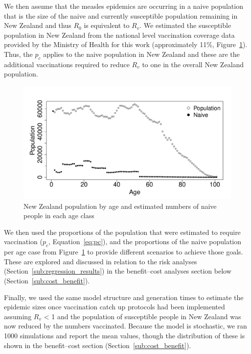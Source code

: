\documentclass{article}
\begin{document}
We then assume that the measles epidemics are occurring in a naive population that is the size of the naive and currently susceptible population remaining in New Zealand and thus $R_0$ is equivalent to $R_v$. We estimated the susceptible population in New Zealand from the national level vaccination coverage data provided by the Ministry of Health for this work (approximately 11\%, Figure~\ref{fig:naive}). Thus, the $p_c$ applies to the naive population in New Zealand and these are the additional vaccinations required to reduce $R_v$ to one in the overall New Zealand population.


\begin{figure}[ht!]
\begin{center}
\includegraphics{interimreport2-021}
\end{center}
\caption{New Zealand population by age and estimated numbers of naive people in each age class}
\label{fig:naive}
\end{figure}

We then used the proportions of the population that were estimated to require vaccination ($p_c$, Equation~\ref{eq:pc}), and the proportions of the naive population per age case from Figure~\ref{fig:naive} to provide different scenarios to achieve those goals. These are explored and discussed in relation to the risk analyses (Section~\ref{sub:regression_results}) in the benefit--cost analyses section below (Section~\ref{sub:cost_benefit}).

Finally, we used the same model structure and generation times to estimate the epidemic sizes once vaccination catch up protocols had been implemented assuming $R_v$ < 1 and the population of susceptible people in New Zealand was now reduced by the numbers vaccinated. Because the model is stochastic, we ran 1000 simulations and report the mean values, though the distribution of these is shown in the benefit--cost section (Section~\ref{sub:cost_benefit}).
\end{document}
